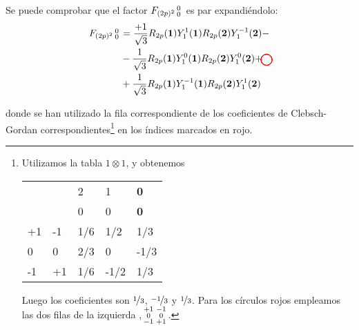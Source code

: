 Se puede comprobar que el factor $F_{(2p)^2}\smqty{0\\0}$ es par
expandiéndolo:
\begin{equation}
  \begin{split}
    F_{(2p)^2} \smqty{0\\0}&= 
    \frac{+1}{\sqrt{3}} R_{2p}(\boldrm{1})Y_1^{1\tikzmark{a}}(\boldrm{1})
    R_{2p}(\boldrm{2}) Y_1^{-1\tikzmark{b}}(\boldrm{2}) -\\
    &- \frac{1}{\sqrt{3}} R_{2p}(\boldrm{1})Y_1^{0\tikzmark{c}}(\boldrm{1})
    R_{2p}(\boldrm{2}) Y_1^{0\tikzmark{d}}(\boldrm{2}) + \\
    & +\frac{1}{\sqrt{3}} R_{2p}(\boldrm{1})Y_1^{-1\tikzmark{e}}(\boldrm{1}) R_{2p}(\boldrm{2}) Y_1^{1\tikzmark{f}}(\boldrm{2})
  \end{split}
  \tikz[overlay,remember picture]
  {
   \draw[color=red,thin] ([xshift=-3pt,yshift=2.3pt]a) circle (0.2cm);
   \draw[color=red,thin] ([xshift=-3pt,yshift=2.3pt]b) circle (0.2cm);
   \draw[color=red,thin] ([xshift=-3pt,yshift=2.3pt]c) circle (0.2cm);
   \draw[color=red,thin] ([xshift=-3pt,yshift=2.3pt]d) circle (0.2cm);
   \draw[color=red,thin] ([xshift=-3pt,yshift=2.3pt]e) circle (0.2cm);
   \draw[color=red,thin] ([xshift=-3pt,yshift=2.3pt]f) circle (0.2cm);
    }
\end{equation}

donde se han utilizado la fila correspondiente de los coeficientes de Clebsch-Gordan
correspondientes\footnote{Utilizamos la tabla $1\otimes 1$, y
  obtenemos
\begin{center}
\begin{tabular}{ll|l|l|l|}
\cline{3-5}
                         &    & 2   & 1    & \textbf{0} \\ \cline{3-5} 
                         &    & 0   & 0    & \textbf{0} \\ \hline
\multicolumn{1}{|l|}{+1} & -1 & 1/6 & 1/2  & 1/3        \\ \hline
\multicolumn{1}{|l|}{0}  & 0  & 2/3 & 0    & -1/3       \\ \hline
\multicolumn{1}{|l|}{-1} & +1 & 1/6 & -1/2 & 1/3        \\ \hline
\end{tabular}
\end{center}
Luego los coeficientes son $\nicefrac{1}{3}$, $\nicefrac{-1}{3}$ y
$\nicefrac{1}{3}$. Para los círculos rojos empleamos las dos filas de
la izquierda ,$\smqty{+1&-1\\ 0 & 0 \\ -1 & +1}$.
} en los índices marcados en rojo.

